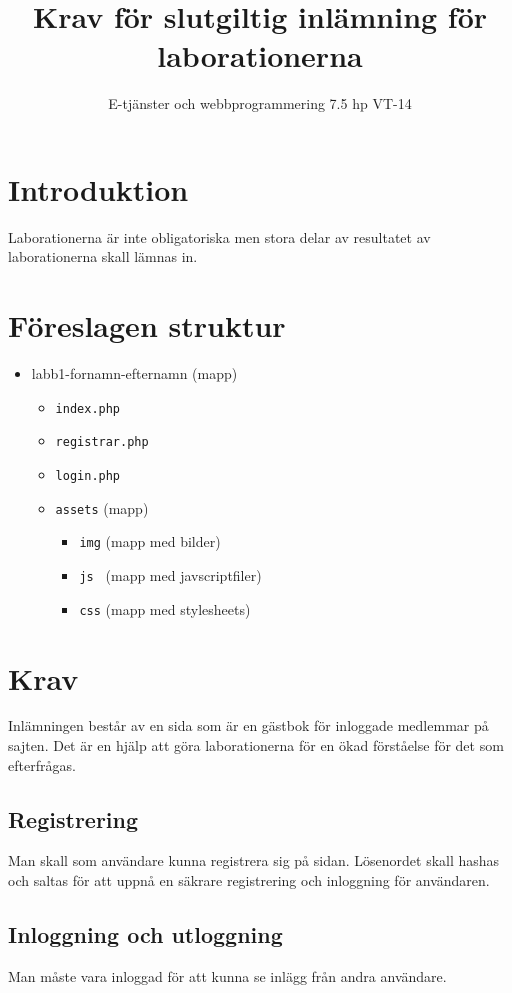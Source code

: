 \documentclass[12pt]{article}
\date{}
\title{ Krav för slutgiltig inlämning för laborationerna }
\author{ E-tjänster och webbprogrammering 7.5 hp VT-14 }
\begin{document}
\maketitle
\vspace{-2em}



\section{Introduktion}
Laborationerna är inte obligatoriska men stora delar av resultatet av laborationerna skall lämnas in. 
\section{Föreslagen struktur}
  \begin{itemize}
    \item labb1-fornamn-efternamn (mapp)
    \begin{itemize}
      \item \texttt{index.php}
      \item \texttt{registrar.php} 
      \item \texttt{login.php}  
      \item \texttt{assets} (mapp)
      \begin{itemize}
        \item \texttt{img} (mapp med bilder)
        \item \texttt{js  } (mapp med javscriptfiler)
        \item \texttt{css} (mapp med stylesheets)
      \end{itemize}
    \end{itemize}
  \end{itemize}
\section {Krav}
Inlämningen består av en sida som är en gästbok för inloggade medlemmar på sajten. Det är en hjälp att göra laborationerna för en ökad förståelse för det som efterfrågas. 
\subsection {Registrering}
Man skall som användare kunna registrera sig på sidan. Lösenordet skall hashas och saltas för att uppnå en säkrare registrering och inloggning för användaren.
\subsection {Inloggning och utloggning}
Man måste vara inloggad för att kunna se inlägg från andra användare. 
\end{document}
